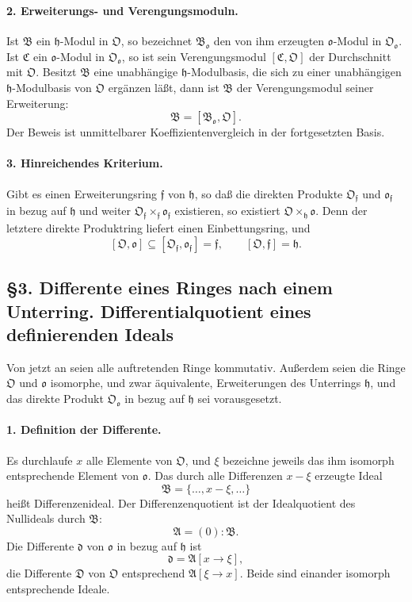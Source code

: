 \documentclass[11pt]{article}
\begin{document}
\paragraph{2. Erweiterungs- und Verengungsmoduln.}
Ist $\mathfrak B$ ein $\mathfrak h$-Modul in $\mathfrak O$, so bezeichnet $\mathfrak B_{\mathfrak o}$ den von ihm erzeugten $\mathfrak o$-Modul in $\mathfrak O_{\mathfrak o}$. Ist $\mathfrak C$ ein $\mathfrak o$-Modul in $\mathfrak O_{\mathfrak o}$, so ist sein Verengungsmodul $[\mathfrak C,\mathfrak O]$ der Durchschnitt mit $\mathfrak O$. Besitzt $\mathfrak B$ eine unabhängige $\mathfrak h$-Modulbasis, die sich zu einer unabhängigen $\mathfrak h$-Modulbasis von $\mathfrak O$ ergänzen läßt, dann ist $\mathfrak B$ der Verengungsmodul seiner Erweiterung:
\[
        \mathfrak B=[\mathfrak B_{\mathfrak o},\mathfrak O].
\]
Der Beweis ist unmittelbarer Koeffizientenvergleich in der fortgesetzten Basis.

\paragraph{3. Hinreichendes Kriterium.}
Gibt es einen Erweiterungsring $\mathfrak f$ von $\mathfrak h$, so daß die direkten Produkte $\mathfrak O_{\mathfrak f}$ und $\mathfrak o_{\mathfrak f}$ in bezug auf $\mathfrak h$ und weiter $\mathfrak O_{\mathfrak f}\times_{\mathfrak f}\mathfrak o_{\mathfrak f}$ existieren, so existiert $\mathfrak O\times_{\mathfrak h}\mathfrak o$. Denn der letztere direkte Produktring liefert einen Einbettungsring, und
\[
        [\mathfrak O,\mathfrak o]\subseteq [\mathfrak O_{\mathfrak f},\mathfrak o_{\mathfrak f}]=\mathfrak f,
        \qquad [\mathfrak O,\mathfrak f]=\mathfrak h.
\]

\subsection*{§3. Differente eines Ringes nach einem Unterring. Differentialquotient eines definierenden Ideals}

Von jetzt an seien alle auftretenden Ringe kommutativ. Außerdem seien die Ringe $\mathfrak O$ und $\mathfrak o$ isomorphe, und zwar äquivalente, Erweiterungen des Unterrings $\mathfrak h$, und das direkte Produkt $\mathfrak O_{\mathfrak o}$ in bezug auf $\mathfrak h$ sei vorausgesetzt.

\paragraph{1. Definition der Differente.}
Es durchlaufe $x$ alle Elemente von $\mathfrak O$, und $\xi$ bezeichne jeweils das ihm isomorph entsprechende Element von $\mathfrak o$. Das durch alle Differenzen $x-\xi$ erzeugte Ideal
\[
        \mathfrak B=\{\ldots,x-\xi,\ldots\}
\]
heißt Differenzenideal. Der Differenzenquotient ist der Idealquotient des Nullideals durch $\mathfrak B$:
\[
        \mathfrak A=(0):\mathfrak B.
\]
Die Differente $\mathfrak d$ von $\mathfrak o$ in bezug auf $\mathfrak h$ ist
\[
        \mathfrak d=\mathfrak A[x\to\xi],
\]
die Differente $\mathfrak D$ von $\mathfrak O$ entsprechend $\mathfrak A[\xi\to x]$. Beide sind einander isomorph entsprechende Ideale.
\end{document}
